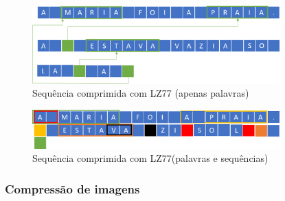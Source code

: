 \begin{figure}[htb]
\centering
\includegraphics[width=0.85\textwidth]{images/gzip.png}
\caption{Sequência comprimida com LZ77 (apenas palavras)}\label{gzip}
\end{figure}
\begin{figure}[htb]
\centering
\includegraphics[width=0.85\textwidth]{images/gzip2.png}
\caption{Sequência comprimida com LZ77(palavras e sequências)}\label{gzip2}
\end{figure}




\subsubsection{Compressão de imagens}
\par


